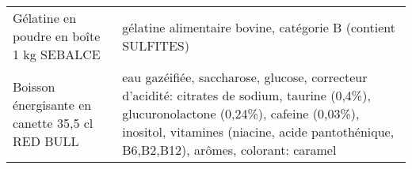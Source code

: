 \begin{longtable}{p{5cm}p{10cm}}
                                                                 Gélatine en poudre en boîte 1 kg SEBALCE &                                                                                                                                                                                                                                                                                                                                                                                                                                                                                                                                                                                                                                                                                                                                                                                                                                                                                                                                                                             gélatine alimentaire bovine, catégorie B (contient SULFITES) \\
                                                          Boisson énergisante en canette 35,5 cl RED BULL &                                                                                                                                                                                                                                                                                                                                                                                                                                                                                                                                                                                                                                                                                                                                                                                                        eau gazéifiée, saccharose, glucose, correcteur d'acidité: citrates de sodium, taurine (0,4\%), glucuronolactone (0,24\%), cafeine (0,03\%), inositol, vitamines (niacine, acide pantothénique, B6,B2,B12), arômes, colorant: caramel \\

\end{longtable}
